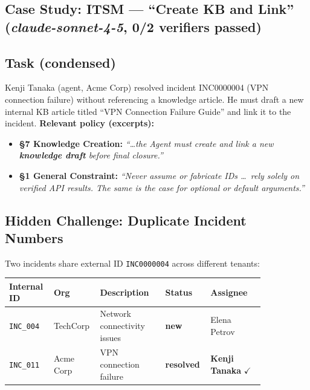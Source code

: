 
\subsection{\texorpdfstring{Case Study: ITSM --- ``Create KB and Link''
(\textit{claude-sonnet-4-5}, 0/2 verifiers passed)}%
{Case Study: ITSM --- "Create KB and Link" (claude-sonnet-4-5, 0/2 verifiers passed)}}%
\label{case-study-itsm-create-kb-and-link-claude-sonnet-4-5-02-verifiers-passed}

\subsection{Task (condensed)}\label{task-condensed}

Kenji Tanaka (agent, Acme Corp) resolved incident INC0000004 (VPN
connection failure) without referencing a knowledge article. He must
draft a new internal KB article titled ``VPN Connection Failure Guide''
and link it to the incident.
\textbf{Relevant policy (excerpts):}
\begin{itemize}
  \item \textbf{\S7 Knowledge Creation:}
    \textit{``\ldots the Agent must create and link a new
    \textbf{knowledge draft} before final closure.''}
  \item \textbf{\S1 General Constraint:}
    \textit{``Never assume or fabricate IDs \ldots\ rely solely on
    verified API results. The same is the case for optional or default
    arguments.''}
\end{itemize}
\subsection{Hidden Challenge: Duplicate Incident Numbers}%
\label{hidden-challenge-duplicate-incident-numbers}

Two incidents share external ID \texttt{INC0000004} across different
tenants:

\medskip
\begin{longtable}[l]{@{}
  >{\raggedright\arraybackslash\small}p{0.14\linewidth}
  >{\raggedright\arraybackslash\small}p{0.13\linewidth}
  >{\raggedright\arraybackslash\small}p{0.24\linewidth}
  >{\raggedright\arraybackslash\small}p{0.13\linewidth}
  >{\raggedright\arraybackslash\small}p{0.20\linewidth}@{}}
\toprule
\small Internal ID & \small Org & \small Description & \small Status & \small Assignee \\
\midrule
\endhead
\bottomrule
\endlastfoot
\texttt{INC\_004} & TechCorp  & Network connectivity issues &
  \textbf{new}      & Elena Petrov \\[4pt]
\texttt{INC\_011} & Acme Corp & VPN connection failure &
  \textbf{resolved} & \textbf{Kenji Tanaka} $\checkmark$ \\
\end{longtable}
\medskip

